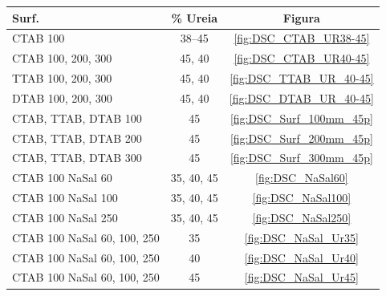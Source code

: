         \begin{table}[H]
                {%
                \begin{tabular}{l c c}
                    \toprule
        			Surf. \mM     & \% Ureia		& Figura 			\\
        			\midrule
        			CTAB 100	  & 38--45			& \ref{fig:DSC_CTAB_UR38-45}	\\
        			CTAB 100, 200, 300	& 45, 40	& \ref{fig:DSC_CTAB_UR40-45}	\\
        			TTAB 100, 200, 300	& 45, 40	& \ref{fig:DSC_TTAB_UR_40-45}	\\
        			DTAB 100, 200, 300	& 45, 40	& \ref{fig:DSC_DTAB_UR_40-45}	\\
        			CTAB, TTAB, DTAB 100	& 45	& \ref{fig:DSC_Surf_100mm_45p}	\\
        			CTAB, TTAB, DTAB 200	& 45	& \ref{fig:DSC_Surf_200mm_45p}	\\
        			CTAB, TTAB, DTAB 300	& 45	& \ref{fig:DSC_Surf_300mm_45p}	\\
        			\midrule
        			CTAB 100 NaSal 60	& 35, 40, 45	& \ref{fig:DSC_NaSal60}		\\
        			CTAB 100 NaSal 100	& 35, 40, 45	& \ref{fig:DSC_NaSal100}	\\
        			CTAB 100 NaSal 250	& 35, 40, 45	& \ref{fig:DSC_NaSal250}	\\
        			CTAB 100 NaSal 60, 100, 250 & 35 	& \ref{fig:DSC_NaSal_Ur35}  \\
        			CTAB 100 NaSal 60, 100, 250 & 40	& \ref{fig:DSC_NaSal_Ur40}  \\
        			CTAB 100 NaSal 60, 100, 250	& 45	& \ref{fig:DSC_NaSal_Ur45}  \\
        			\bottomrule
                \end{tabular}%
                }{}
        \end{table}
		
		
